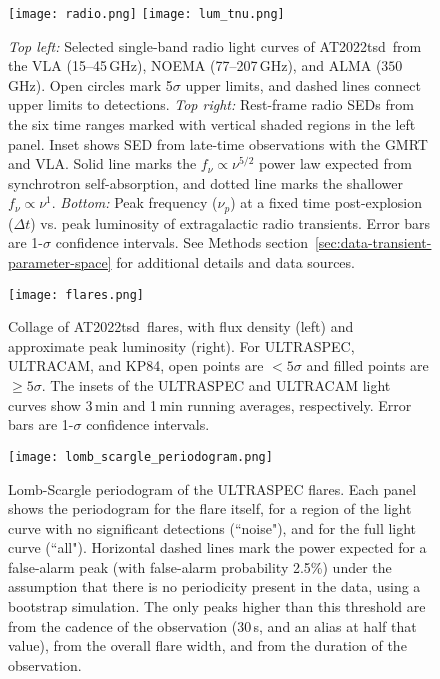 \documentclass{nature_plusfigure}
\newcommand{\at}{AT2022tsd}
\begin{document}
\begin{extended_data}
\begin{figure}[!ht]
 \centering
\texttt{[image: radio.png]}
\texttt{[image: lum\_tnu.png]}
  \caption{\emph{Top left:} Selected single-band radio light curves of \at\ from the VLA (15--45\,GHz), NOEMA (77--207\,GHz), and ALMA ($350$\,GHz). Open circles mark 5$\sigma$ upper limits, and dashed lines connect upper limits to detections. \emph{Top right:} Rest-frame radio SEDs from the six time ranges marked with vertical shaded regions in the left panel. Inset shows SED from late-time observations with the GMRT and VLA. Solid line marks the $f_\nu \propto \nu^{5/2}$ power law expected from synchrotron self-absorption, and dotted line marks the shallower $f_\nu \propto \nu^{1}$. \emph{Bottom:} Peak frequency ($\nu_p$) at a fixed time post-explosion ($\Delta t$) vs. peak luminosity of extragalactic radio transients. Error bars are 1-$\sigma$ confidence intervals. See Methods section~\ref{sec:data-transient-parameter-space} for additional details and data sources.}
 \label{fig:radio}
\end{figure}

\begin{figure}[ht]
 \centering
\texttt{[image: flares.png]}
  \caption{Collage of \at\ flares, with flux density (left) and approximate peak luminosity (right). For ULTRASPEC, ULTRACAM, and KP84, open points are $<5\sigma$ and filled points are $\geq5\sigma$. The insets of the ULTRASPEC and ULTRACAM light curves show 3\,min and 1\,min running averages, respectively. Error bars are 1-$\sigma$ confidence intervals.
}
 \label{fig:flare-collage}
\end{figure}

\begin{figure*}[ht]
    \centering
    \texttt{[image: lomb\_scargle\_periodogram.png]}
    \caption{Lomb-Scargle periodogram of the ULTRASPEC flares. Each panel shows the periodogram for the flare itself, for a region of the light curve with no significant detections (``noise"), and for the full light curve (``all"). Horizontal dashed lines mark the power expected for a false-alarm peak (with false-alarm probability 2.5\%) under the assumption that there is no periodicity present in the data, using a bootstrap simulation. The only peaks higher than this threshold are from the cadence of the observation (30\,s, and an alias at half that value), from the overall flare width, and from the duration of the observation.}
    \label{fig:ultraspec-periodogram}
\end{figure*}


\end{extended_data}
\end{document}
